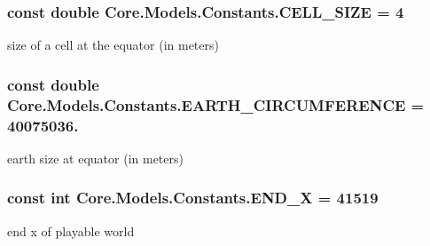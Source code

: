 \subsubsection[{C\+E\+L\+L\+\_\+\+S\+I\+Z\+E}]{\setlength{\rightskip}{0pt plus 5cm}const double Core.\+Models.\+Constants.\+C\+E\+L\+L\+\_\+\+S\+I\+Z\+E = 4}\label{classCore_1_1Models_1_1Constants_adde91f87a25a57db171667f80b72d69f}


size of a cell at the equator (in meters) 

\hypertarget{classCore_1_1Models_1_1Constants_ad31578c20b30dd96faf43b7a9f7b0389}{}
\subsubsection[{E\+A\+R\+T\+H\+\_\+\+C\+I\+R\+C\+U\+M\+F\+E\+R\+E\+N\+C\+E}]{\setlength{\rightskip}{0pt plus 5cm}const double Core.\+Models.\+Constants.\+E\+A\+R\+T\+H\+\_\+\+C\+I\+R\+C\+U\+M\+F\+E\+R\+E\+N\+C\+E = 40075036.}\label{classCore_1_1Models_1_1Constants_ad31578c20b30dd96faf43b7a9f7b0389}


earth size at equator (in meters) 

\hypertarget{classCore_1_1Models_1_1Constants_ab564a2138347d9c65862ffe4d80c6735}{}
\subsubsection[{E\+N\+D\+\_\+\+X}]{\setlength{\rightskip}{0pt plus 5cm}const int Core.\+Models.\+Constants.\+E\+N\+D\+\_\+\+X = 41519}\label{classCore_1_1Models_1_1Constants_ab564a2138347d9c65862ffe4d80c6735}


end x of playable world 

\hypertarget{classCore_1_1Models_1_1Constants_ae2cd96ff453731f63095739737f184b4}{}
